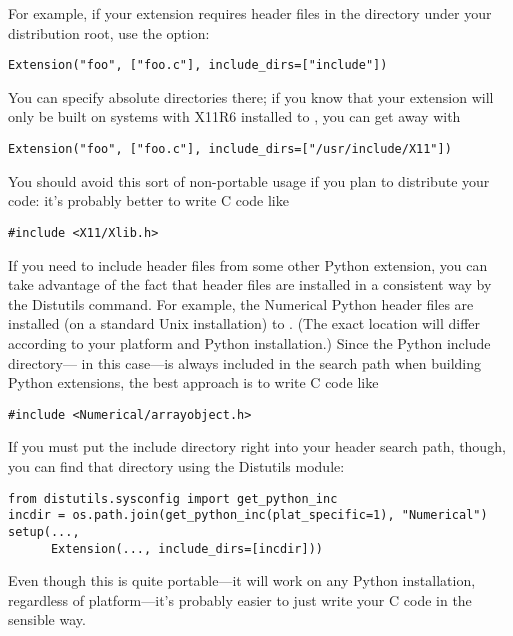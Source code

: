 \documentclass{howto}
\begin{document}
For example, if your extension requires header files in the
 directory under your distribution root, use the
 option:

\begin{verbatim}
Extension("foo", ["foo.c"], include_dirs=["include"])
\end{verbatim}

You can specify absolute directories there; if you know that your
extension will only be built on \UNIX{} systems with X11R6 installed to
, you can get away with

\begin{verbatim}
Extension("foo", ["foo.c"], include_dirs=["/usr/include/X11"])
\end{verbatim}

You should avoid this sort of non-portable usage if you plan to
distribute your code: it's probably better to write C code like
\begin{verbatim}
#include <X11/Xlib.h>
\end{verbatim}

If you need to include header files from some other Python extension,
you can take advantage of the fact that header files are installed in a
consistent way by the Distutils  command.  For
example, the Numerical Python header files are installed (on a standard
Unix installation) to .
(The exact location will differ according to your platform and Python
installation.)  Since the Python include
directory--- in this case---is always
included in the search path when building Python extensions, the best
approach is to write C code like
\begin{verbatim}
#include <Numerical/arrayobject.h>
\end{verbatim}
If you must put the  include directory right into your
header search path, though, you can find that directory using the
Distutils  module:

\begin{verbatim}
from distutils.sysconfig import get_python_inc
incdir = os.path.join(get_python_inc(plat_specific=1), "Numerical")
setup(...,
      Extension(..., include_dirs=[incdir]))
\end{verbatim}

Even though this is quite portable---it will work on any Python
installation, regardless of platform---it's probably easier to just
write your C code in the sensible way.
\end{document}
